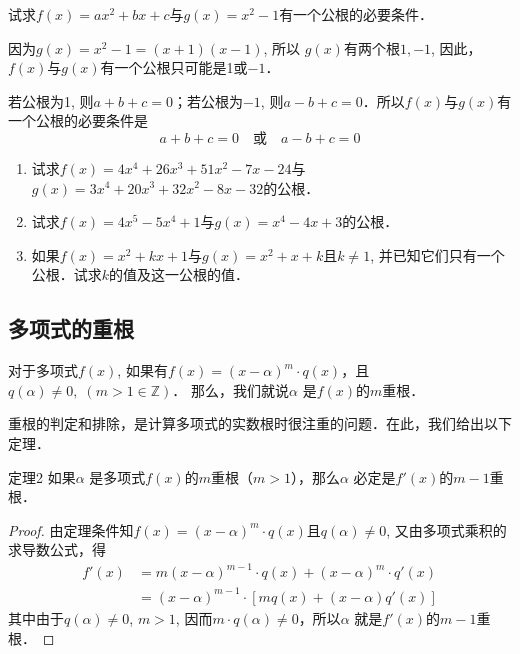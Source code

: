 \begin{example}
    试求$f(x)=ax^2+bx+c$与$g(x)=x^2-1$有一个公根的必要条件．
\end{example}

\begin{solution}
    因为$g(x)=x^2-1=(x+1)(x-1)$, 所以
    $g(x)$有两个根$1,-1$, 因此，$f(x)$与$g(x)$有一个公根只可能是1或$-1$．

若公根为1, 则$a+b+c=0$；若公根为$-1$, 则$a-b+c=0$．所以$f(x)$与$g(x)$有一个公根的必要条件是
\[a+b+c=0\quad \text{或}\quad a-b+c=0\]
\end{solution}

\begin{ex}
    \begin{enumerate}
        \item 试求$f(x)=4x^4+26x^3+51x^2-7x-24$与
$g(x)=3x^4+20x^3+32x^2-8x-32$的公根．
\item 试求$f(x)=4x^5-5x^4+1$与$g(x)=x^4-4x+3$的公根．
\item 如果$f(x)=x^2+kx+1$与$g(x)=x^2+x+k$且$k\ne 1$,
并已知它们只有一个公根．试求$k$的值及这一公根的值．
    \end{enumerate}
\end{ex}

\subsection{多项式的重根}

对于多项式$f(x)$, 如果有$f(x)=(x-\alpha )^m\cdot q(x)$，且$q(\alpha )\ne 0,\; (m>1\in\mathbb{Z})$．
那么，我们就说$\alpha$ 是$f(x)$的$m$重根．

重根的判定和排除，是计算多项式的实数根时很注重的问题．在此，我们给出以下定理．

\begin{blk}{定理2}
    如果$\alpha$ 是多项式$f(x)$的$m$重根（$m>1$），那么$\alpha$ 必定是$f'(x)$的$m-1$重根．
\end{blk}

\begin{proof}
    由定理条件知$f(x)=(x-\alpha )^m\cdot q(x)$且$q(\alpha )\ne 0$, 又由多项式乘积的求导数公式，得
\[\begin{split}
     f' (x) &=m (x-\alpha )^{m-1}\cdot q (x) + (x-\alpha )^m\cdot q'(x)\\
&=(x-\alpha ) ^{m-1}\cdot  [mq (x) + (x-\alpha ) q' (x) ]
\end{split}\]
其中由于$q(\alpha )\ne 0$, $m>1$, 因而$m\cdot q(\alpha )\ne 0$，所以$\alpha$ 就是$f'(x)$的$m-1$重根．
\end{proof}

